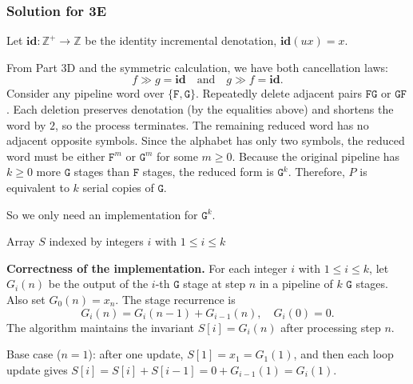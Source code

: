 \documentclass[11pt]{article}
\newcommand{\Z}{\mathbb{Z}}
\newcommand{\kplus}{^+}
\newcommand{\serial}{\gg}
\newcommand{\F}{\texttt{F}}
\newcommand{\G}{\texttt{G}}
\begin{document}
\subsubsection*{Solution for 3E}

Let $\mathbf{id}: \Z\kplus \to \Z$ be the identity incremental denotation, $\mathbf{id}(u x)=x$.

From Part 3D and the symmetric calculation, we have both cancellation laws:
\[
f \serial g = \mathbf{id}
\quad\text{and}\quad
g \serial f = \mathbf{id}.
\]
Consider any pipeline word over $\{\F,\G\}$. Repeatedly delete adjacent pairs $\F\G$ or $\G\F$. Each deletion preserves denotation (by the equalities above) and shortens the word by $2$, so the process terminates. The remaining reduced word has no adjacent opposite symbols. Since the alphabet has only two symbols, the reduced word must be either $\F^m$ or $\G^m$ for some $m \ge 0$. Because the original pipeline has $k \ge 0$ more $\G$ stages than $\F$ stages, the reduced form is $\G^k$. Therefore, $P$ is equivalent to $k$ serial copies of $\G$.

So we only need an implementation for $\G^k$.
\begin{center}
\begin{minipage}{0.3\textwidth}
\SetAlgoLined
\setcounter{AlgoLine}{0}



Array $S$ indexed by integers $i$ with $1 \le i \le k$


\Fn{\Update{$\Z\ x$}}{
	\If{$k=0$}{
		\Return $x$
	}
	$S[1] \leftarrow S[1] + x$

	\For{$i \leftarrow 2$ \KwTo $k$}{
		$S[i] \leftarrow S[i] + S[i-1]$
	}
	\Return $S[k]$
}
\end{minipage}
\end{center}

\textbf{Correctness of the implementation.}
For each integer $i$ with $1 \le i \le k$, let $G_i(n)$ be the output of the $i$-th $\G$ stage at step $n$ in a pipeline of $k$ $\G$ stages. Also set $G_0(n)=x_n$. The stage recurrence is
\[
G_i(n)=G_i(n-1)+G_{i-1}(n), \quad G_i(0)=0.
\]
The algorithm maintains the invariant $S[i]=G_i(n)$ after processing step $n$.

Base case ($n=1$): after one update, $S[1]=x_1=G_1(1)$, and then each loop update gives $S[i]=S[i]+S[i-1]=0+G_{i-1}(1)=G_i(1)$.
\end{document}
